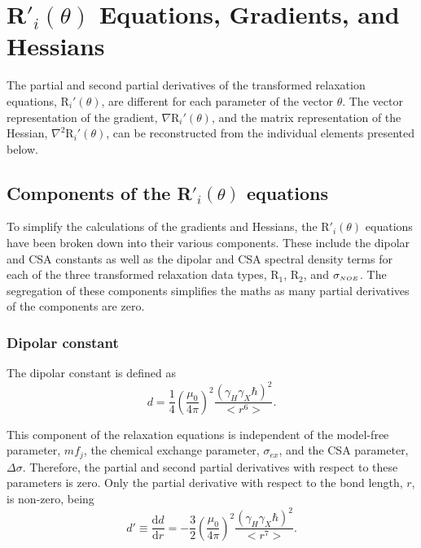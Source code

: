 
\newpage
\section{R$'_i(\theta)$ Equations, Gradients, and Hessians}

The partial and second partial derivatives of the transformed relaxation equations, R$_i'(\theta)$, are different for each parameter of the vector $\theta$.  The vector representation of the gradient, $\nabla \textrm{R}_i'(\theta)$, and the matrix representation of the Hessian, $\nabla^2 \textrm{R}_i'(\theta)$, can be reconstructed from the individual elements presented below.



\subsection{Components of the R$'_i(\theta)$ equations}

To simplify the calculations of the gradients and Hessians, the R$'_i(\theta)$ equations have been broken down into their various components.  These include the dipolar and CSA constants as well as the dipolar and CSA spectral density terms for each of the three transformed relaxation data types, R$_1$, R$_2$, and $\sigma_{\scriptscriptstyle NOE}$.  The segregation of these components simplifies the maths as many partial derivatives of the components are zero.


\subsubsection{Dipolar constant}

The dipolar constant is defined as
\begin{equation}
    d = \frac{1}{4} \left(\frac{\mu_0}{4\pi}\right)^2 \frac{\left( \gamma_H \gamma_X \hbar \right)^2}{<r^6>}. \label{eq: Ri': d}
\end{equation}

\noindent This component of the relaxation equations is independent of the model-free parameter, $mf_j$, the chemical exchange parameter, $\sigma_{ex}$, and the CSA parameter, $\Delta\sigma$.  Therefore, the partial and second partial derivatives with respect to these parameters is zero.  Only the partial derivative with respect to the bond length, $r$, is non-zero, being
\begin{equation}
    d' \equiv \frac{\mathrm{d} d}{\mathrm{d} r} = - \frac{3}{2} \left(\frac{\mu_0}{4\pi}\right)^2 \frac{\left( \gamma_H \gamma_X \hbar \right)^2}{<r^7>}. \label{eq: Ri': d'}
\end{equation}

